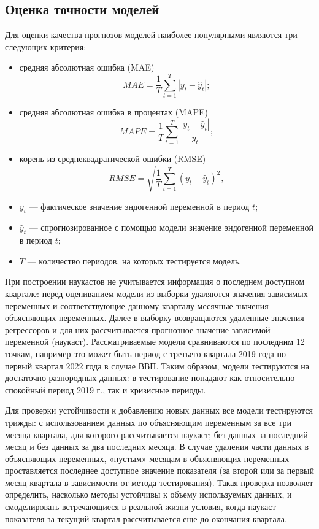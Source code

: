 \documentclass[a4paper, 12pt]{extarticle}
\numberwithin{equation}{subsection}
\begin{document}
	\subsection{Оценка точности моделей}
	Для оценки качества прогнозов моделей наиболее популярными являются три следующих критерия: 
	\begin{itemize}
		\item средняя абсолютная ошибка (MAE) 
		\begin{equation}
			MAE = \dfrac{1}{T}\sum_{t=1}^{T}|y_t - \hat y _t|;
		\end{equation}
		\item средняя абсолютная ошибка в процентах (MAPE)
		\begin{equation}
			MAPE = \dfrac{1}{T}\sum_{t=1}^{T}\dfrac{|y_t - \hat y _t|}{y_t};
		\end{equation}
		\item корень из среднеквадратической ошибки (RMSE)
		\begin{equation}
			RMSE = \sqrt{\dfrac{1}{T}\sum_{t=1}^{T}(y_t - \hat y_t)^2},
		\end{equation}
	\end{itemize}
	\begin{itemize}
		\item $y_t$ --- фактическое значение эндогенной переменной в период $t$;
		\item $\hat y _t$ --- спрогнозированное с помощью модели значение эндогенной переменной в период $t$;
		\item $T$ --- количество периодов, на которых тестируется модель.
	\end{itemize}  	
	При построении наукастов не учитывается информация о последнем доступном квартале: перед оцениванием модели из выборки удаляются значения зависимых переменных и соответствующие данному кварталу месячные значения объясняющих переменных. Далее в выборку возвращаются удаленные значения регрессоров и для них рассчитывается прогнозное значение зависимой переменной (наукаст). Рассматриваемые модели сравниваются по последним 12 точкам, например это может быть период с третьего квартала 2019 года по первый квартал 2022 года в случае ВВП. Таким образом, модели тестируются на достаточно разнородных данных: в тестирование попадают как относительно спокойный период 2019 г., так и кризисные периоды.
	
	Для проверки устойчивости к добавлению новых данных все модели тестируются трижды: с использованием данных по объясняющим переменным за все три месяца квартала, для которого рассчитывается наукаст; без данных за последний месяц и без данных за два последних месяца. В случае удаления части данных в объясняющих переменных, «пустым» месяцам в объясняющих переменных проставляется последнее доступное значение показателя (за второй или за первый месяц квартала в зависимости от метода тестирования). Такая проверка позволяет определить, насколько методы устойчивы к объему используемых данных, и смоделировать встречающиеся в реальной жизни условия, когда наукаст показателя за текущий квартал рассчитывается еще до окончания квартала. 
	
\end{document}
